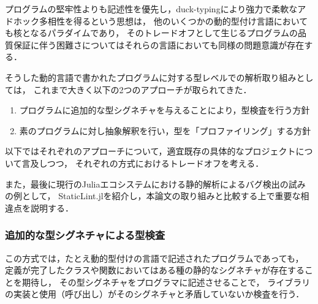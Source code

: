 
プログラムの堅牢性よりも記述性を優先し，duck-typingにより強力で柔軟なアドホック多相性を得るという思想は，
他のいくつかの動的型付け言語においても核となるパラダイムであり，
そのトレードオフとして生じるプログラムの品質保証に伴う困難さについてはそれらの言語においても同様の問題意識が存在する．

そうした動的言語で書かれたプログラムに対する型レベルでの解析取り組みとしては，
これまで大きく以下の2つのアプローチが取られてきた．

\begin{enumerate}
  \item プログラムに追加的な型シグネチャを与えることにより，型検査を行う方針
  \item 素のプログラムに対し抽象解釈を行い，型を「プロファイリング」する方針
\end{enumerate}

以下ではそれぞれのアプローチについて，適宜既存の具体的なプロジェクトについて言及しつつ，
それぞれの方式におけるトレードオフを考える．

また，最後に現行のJuliaエコシステムにおける静的解析によるバグ検出の試みの例として，
StaticLint.jlを紹介し，本論文の取り組みと比較する上で重要な相違点を説明する．

\subsubsection{追加的な型シグネチャによる型検査} \label{subsubsection:type-check-with-annotation}


この方式では，たとえ動的型付けの言語で記述されたプログラムであっても，
定義が完了したクラスや関数においてはある種の静的なシグネチャが存在することを期待し，
その型シグネチャをプログラマに記述させることで，
ライブラリの実装と使用（呼び出し）がそのシグネチャと矛盾していないか検査を行う\cite{ruby-progress-report}．

